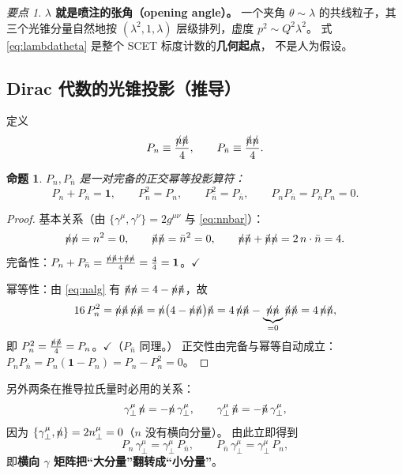 \documentclass[UTF8,a4paper,11pt]{ctexart}
\theoremstyle{definition}
\theoremstyle{remark}
\newtheorem{keypoint}{要点}[section]
\theoremstyle{plain}
\newtheorem{proposition}{命题}[section]
\newcommand{\nsl}{n\mkern-10.5mu/\mkern1.5mu}
\newcommand{\nbsl}{\bar{n}\mkern-10.5mu/\mkern1.5mu}
\newcommand{\en}[1]{\textsf{#1}}   %
\begin{document}
\begin{keypoint}
\textbf{$\lambda$ 就是喷注的张角（\en{opening angle}）。}
一个夹角 $\theta\sim\lambda$ 的共线粒子，其三个光锥分量自然地按
$(\lambda^2,1,\lambda)$ 层级排列，虚度 $p^2\sim Q^2\lambda^2$。
式 \eqref{eq:lambdatheta} 是整个 SCET 标度计数的\textbf{几何起点}，
不是人为假设。
\end{keypoint}

\subsection{Dirac 代数的光锥投影（推导）}
\label{subsec:projectors}

定义
\begin{equation}
  P_n\equiv\frac{\nsl\nbsl}{4},
  \qquad
  P_{\bar n}\equiv\frac{\nbsl\nsl}{4} .
  \label{eq:projdef}
\end{equation}

\begin{proposition}
$P_n,P_{\bar n}$ 是一对完备的正交幂等投影算符：
\begin{equation}
  P_n+P_{\bar n}=\mathbf 1,
  \qquad
  P_n^2=P_n,
  \qquad
  P_{\bar n}^2=P_{\bar n},
  \qquad
  P_nP_{\bar n}=P_{\bar n}P_n=0 .
\end{equation}
\end{proposition}

\begin{proof}
基本关系（由 $\{\gamma^\mu,\gamma^\nu\}=2g^{\mu\nu}$ 与 \eqref{eq:nnbar}）：
\begin{equation}
  \nsl\nsl=n^2=0,
  \qquad
  \nbsl\nbsl=\bar n^2=0,
  \qquad
  \nsl\nbsl+\nbsl\nsl=2\,n\cdot\bar n=4 .
  \label{eq:nalg}
\end{equation}
完备性：$P_n+P_{\bar n}=\frac{\nsl\nbsl+\nbsl\nsl}{4}=\frac44=\mathbf1$。$\checkmark$

幂等性：由 \eqref{eq:nalg} 有 $\nbsl\nsl=4-\nsl\nbsl$，故
\begin{align}
  16\,P_n^2=\nsl\nbsl\,\nsl\nbsl
  =\nsl\big(4-\nsl\nbsl\big)\nbsl
  =4\,\nsl\nbsl-\underbrace{\nsl\nsl}_{=0}\nbsl\nbsl
  =4\,\nsl\nbsl ,
\end{align}
即 $P_n^2=\frac{\nsl\nbsl}{4}=P_n$。$\checkmark$（$P_{\bar n}$ 同理。）
正交性由完备与幂等自动成立：
$P_nP_{\bar n}=P_n(\mathbf1-P_n)=P_n-P_n^2=0$。
\end{proof}

另外两条在推导拉氏量时必用的关系：
\begin{equation}
  \gamma_\perp^\mu\,\nsl=-\nsl\,\gamma_\perp^\mu,
  \qquad
  \gamma_\perp^\mu\,\nbsl=-\nbsl\,\gamma_\perp^\mu ,
  \label{eq:anticomm}
\end{equation}
因为 $\{\gamma_\perp^\mu,\nsl\}=2n^\mu_\perp=0$（$n$ 没有横向分量）。
由此立即得到
\begin{equation}
  P_n\,\gamma_\perp^\mu=\gamma_\perp^\mu\,P_{\bar n},
  \qquad
  P_{\bar n}\,\gamma_\perp^\mu=\gamma_\perp^\mu\,P_{n} ,
  \label{eq:projflip}
\end{equation}
即\textbf{横向 $\gamma$ 矩阵把“大分量”翻转成“小分量”}。
\end{document}
